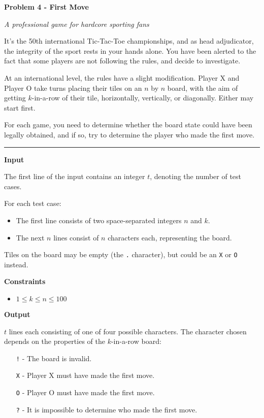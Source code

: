 \LARGE \textbf{Problem 4 - First Move} \normalsize

{\itshape A professional game for hardcore sporting fans}

It's the 50th international Tic-Tac-Toe championships, and as head adjudicator, 
the integrity of the sport rests in your hands alone. 
You have been alerted to the fact that some players are not following the rules,
and decide to investigate.

At an international level, the rules have a slight modification. 
Player X and Player O take turns placing their tiles on an $n$ by $n$ board, 
with the aim of getting $k$-in-a-row of their tile, horizontally, vertically, or diagonally. 
Either may start first.

For each game, you need to determine whether the board state could have been legally obtained, 
and if so, try to determine the player who made the first move.

\vspace{8pt}
\hrule

\textbf{Input}

The first line of the input contains an integer $t$, denoting the number of test cases.

For each test case:

\begin{itemize}
    \item The first line consists of two space-separated integers $n$ and $k$.
    \item The next $n$ lines consist of $n$ characters each, representing the board.
\end{itemize}

Tiles on the board may be empty (the \texttt{.} character), but could be an \texttt{X} or \texttt{O} instead.

\textbf{Constraints}

\begin{itemize}
    \item $1 \leq k \leq n \leq 100$
\end{itemize}

\textbf{Output}

$t$ lines each consisting of one of four possible characters. The character chosen depends on the properties of the $k$-in-a-row board:

\begin{itemize}
    \item[\texttt{!}] - The board is invalid.
    \item[\texttt{X}] - Player X must have made the first move.
    \item[\texttt{O}] - Player O must have made the first move.
    \item[\texttt{?}] - It is impossible to determine who made the first move.
\end{itemize}

